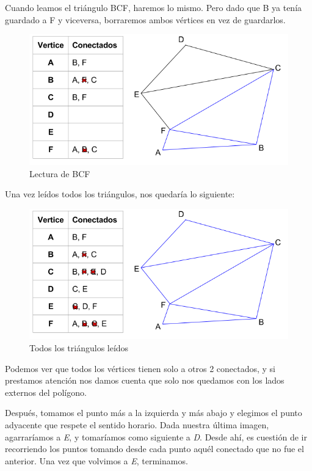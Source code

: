 Cuando leamos el triángulo BCF, haremos lo mismo. Pero dado que B ya tenía guardado a F y viceversa, borraremos ambos vértices en vez de guardarlos.
\begin{figure}[H]\centering\includegraphics[scale=0.7]{Imagenes/ej1/Imagen_E.png}\caption{Lectura de BCF}\end{figure}

Una vez leídos todos los triángulos, nos quedaría lo siguiente:
\begin{figure}[H]\centering\includegraphics[scale=0.7]{Imagenes/ej1/Imagen_F.png}\caption{Todos los triángulos leídos}\end{figure}

Podemos ver que todos los vértices tienen solo a otros 2 conectados, y si prestamos atención nos damos cuenta que solo nos quedamos con los lados externos del polígono.

Después, tomamos el punto más a la izquierda y más abajo y elegimos el punto adyacente que respete el sentido horario. Dada nuestra última imagen, agarraríamos a \textit{E}, y tomaríamos como siguiente a \textit{D}. Desde ahí, es cuestión de ir recorriendo los puntos tomando desde cada punto aquél conectado que no fue el anterior. Una vez que volvimos a \textit{E}, terminamos.
